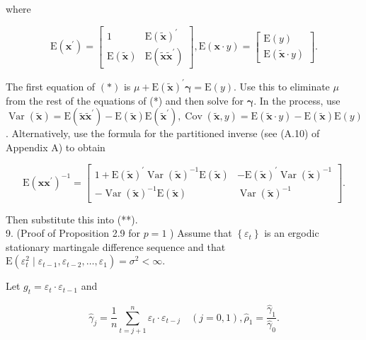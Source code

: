 \documentclass[10pt]{article}
\begin{document}
where

$$
\mathrm{E}\left(\mathbf{x}^{\prime}\right)=\left[\begin{array}{cc}
1 & \mathrm{E}(\tilde{\mathbf{x}})^{\prime} \\
\mathrm{E}(\tilde{\mathbf{x}}) & \mathrm{E}\left(\tilde{\mathbf{x}} \tilde{\mathbf{x}}^{\prime}\right)
\end{array}\right], \mathrm{E}(\mathbf{x} \cdot y)=\left[\begin{array}{c}
\mathrm{E}(y) \\
\mathrm{E}(\tilde{\mathbf{x}} \cdot y)
\end{array}\right] .
$$

The first equation of $(*)$ is $\mu+\mathrm{E}(\tilde{\mathbf{x}})^{\prime} \boldsymbol{\gamma}=\mathrm{E}(y)$. Use this to eliminate $\mu$ from the rest of the equations of (*) and then solve for $\boldsymbol{\gamma}$. In the process, use $\operatorname{Var}(\tilde{\mathbf{x}})= \mathrm{E}\left(\tilde{\mathbf{x}} \tilde{\mathbf{x}}^{\prime}\right)-\mathrm{E}(\tilde{\mathbf{x}}) \mathrm{E}\left(\tilde{\mathbf{x}}^{\prime}\right), \operatorname{Cov}(\tilde{\mathbf{x}}, y)=\mathrm{E}(\tilde{\mathbf{x}} \cdot y)-\mathrm{E}(\tilde{\mathbf{x}}) \mathrm{E}(y)$. Alternatively, use the formula for the partitioned inverse (see (A.10) of Appendix A) to obtain

$$
\mathrm{E}\left(\mathbf{x} \mathbf{x}^{\prime}\right)^{-1}=\left[\begin{array}{cc}
1+\mathrm{E}(\tilde{\mathbf{x}})^{\prime} \operatorname{Var}(\tilde{\mathbf{x}})^{-1} \mathrm{E}(\tilde{\mathbf{x}}) & -\mathrm{E}(\tilde{\mathbf{x}})^{\prime} \operatorname{Var}(\tilde{\mathbf{x}})^{-1} \\
-\operatorname{Var}(\tilde{\mathbf{x}})^{-1} \mathrm{E}(\tilde{\mathbf{x}}) & \operatorname{Var}(\tilde{\mathbf{x}})^{-1}
\end{array}\right] .
$$

Then substitute this into (**).\\
9. (Proof of Proposition 2.9 for $p=1$ ) Assume that $\left\{\varepsilon_{t}\right\}$ is an ergodic stationary martingale difference sequence and that $\mathrm{E}\left(\varepsilon_{t}^{2} \mid \varepsilon_{t-1}, \varepsilon_{t-2}, \ldots, \varepsilon_{1}\right)=\sigma^{2}<\infty$.

Let $g_{t}=\varepsilon_{t} \cdot \varepsilon_{t-1}$ and

$$
\hat{\gamma}_{j}=\frac{1}{n} \sum_{t=j+1}^{n} \varepsilon_{t} \cdot \varepsilon_{t-j} \quad(j=0,1), \hat{\rho}_{1}=\frac{\hat{\gamma}_{1}}{\hat{\gamma}_{0}} .
$$
\end{document}

